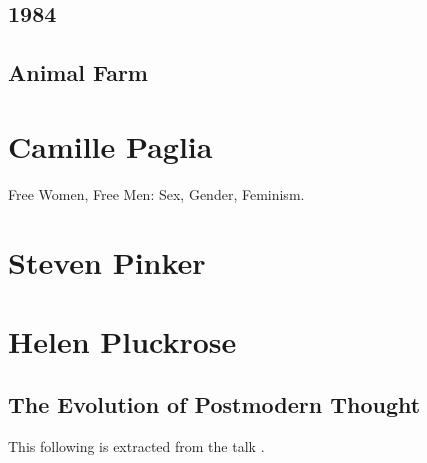 \documentclass[10pt,titlepage]{book}
\begin{document}
\subsection{1984}

\cite{orwell-1984}

\subsection{Animal Farm}

\cite{orwell-af}

\section{Camille Paglia}

Free Women, Free Men: Sex, Gender, Feminism.\cite{paglia-fw}

\section{Steven Pinker}

\cite{pinker-tbs,pinker-angels,pinker-en}

\section{Helen Pluckrose}

\subsection{The Evolution of Postmodern Thought}

This following is extracted from the talk \cite{pluckrose-evolution}.
\end{document}
